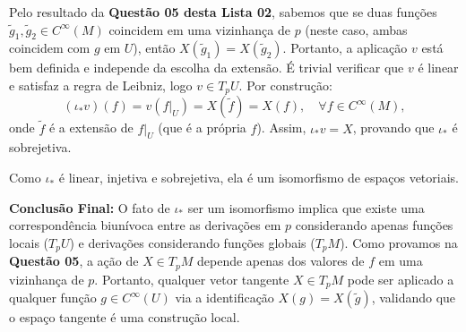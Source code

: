{	Pelo resultado da \textbf{Questão 05 desta Lista 02}, sabemos que se duas funções $\tilde{g}_1, \tilde{g}_2 \in C^\infty(M)$ coincidem em uma vizinhança de $p$ (neste caso, ambas coincidem com $g$ em $U$), então $X(\tilde{g}_1) = X(\tilde{g}_2)$. Portanto, a aplicação $v$ está bem definida e independe da escolha da extensão. É trivial verificar que $v$ é linear e satisfaz a regra de Leibniz, logo $v \in T_p U$. Por construção:
	\begin{equation*}
		(\iota_* v)(f) = v(f|_U) = X(\tilde{f}) = X(f), \quad \forall f \in C^\infty(M),
	\end{equation*}
	onde $\tilde{f}$ é a extensão de $f|_U$ (que é a própria $f$). Assim, $\iota_* v = X$, provando que $\iota_*$ é sobrejetiva.
	
	Como $\iota_*$ é linear, injetiva e sobrejetiva, ela é um isomorfismo de espaços vetoriais.
	
	\textbf{Conclusão Final:}
	O fato de $\iota_*$ ser um isomorfismo implica que existe uma correspondência biunívoca entre as derivações em $p$ considerando apenas funções locais ($T_p U$) e derivações considerando funções globais ($T_p M$). Como provamos na \textbf{Questão 05}, a ação de $X \in T_p M$ depende apenas dos valores de $f$ em uma vizinhança de $p$. Portanto, qualquer vetor tangente $X \in T_p M$ pode ser aplicado a qualquer função $g \in C^\infty(U)$ via a identificação $X(g) = X(\tilde{g})$, validando que o espaço tangente é uma construção local.
}
